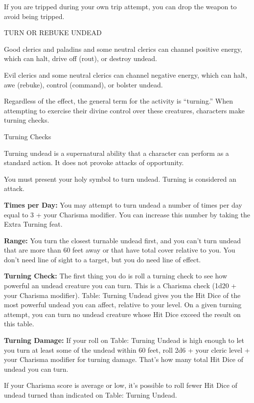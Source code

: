 \documentclass{article}
\begin{document}
If you are tripped during your own trip attempt, you can drop the weapon to avoid 
being tripped.

\vspace{12pt}
TURN OR REBUKE UNDEAD

Good clerics and paladins and some neutral clerics can channel positive energy, 
which can halt, drive off (rout), or destroy undead.

Evil clerics and some neutral clerics can channel negative energy, which can halt, 
awe (rebuke), control (command), or bolster undead.

Regardless of the effect, the general term for the activity is ``turning.'' When 
attempting to exercise their divine control over these creatures, characters make 
turning checks.

\vspace{12pt}
Turning Checks

Turning undead is a supernatural ability that a character can perform as a standard 
action. It does not provoke attacks of opportunity.

You must present your holy symbol to turn undead. Turning is considered an attack.

\textbf{Times per Day: }You may attempt to turn undead a number of times per day 
equal to 3 + your Charisma modifier. You can increase this number by taking the 
Extra Turning feat.

\textbf{Range:} You turn the closest turnable undead first, and you can't turn 
undead that are more than 60 feet away or that have total cover relative to you. 
You don't need line of sight to a target, but you do need line of effect.

\textbf{Turning Check:} The first thing you do is roll a turning check to see how 
powerful an undead creature you can turn. This is a Charisma check (1d20 + your 
Charisma modifier). Table: Turning Undead gives you the Hit Dice of the most powerful 
undead you can affect, relative to your level. On a given turning attempt, you 
can turn no undead creature whose Hit Dice exceed the result on this table.

\textbf{Turning Damage:} If your roll on Table: Turning Undead is high enough to 
let you turn at least some of the undead within 60 feet, roll 2d6 + your cleric 
level + your Charisma modifier for turning damage. That's how many total Hit Dice 
of undead you can turn.

If your Charisma score is average or low, it's possible to roll fewer Hit Dice 
of undead turned than indicated on Table: Turning Undead.
\end{document}
